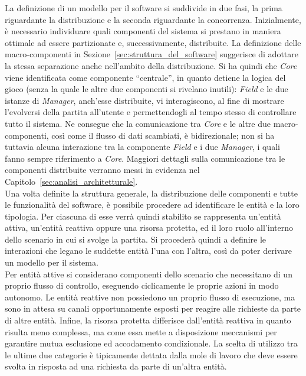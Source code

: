 La definizione di un modello per il software si suddivide in due fasi, la prima riguardante la distribuzione e la seconda riguardante la concorrenza. Inizialmente, è necessario individuare quali componenti del sistema si prestano in maniera ottimale ad essere partizionate e, successivamente, distribuite. La definizione delle macro-componenti in Sezione~\ref{sec:struttura_del_software} suggerisce di adottare la stessa separazione anche nell'ambito della distribuzione. Si ha quindi che \emph{Core} viene identificata come componente ``centrale'', in quanto detiene la logica del gioco (senza la quale le altre due componenti si rivelano inutili): \emph{Field} e le due istanze di \emph{Manager}, anch'esse distribuite, vi interagiscono, al fine di mostrare l'evolversi della partita all'utente e permettendogli al tempo stesso di controllare tutto il sistema. Ne consegue che la comunicazione tra \emph{Core} e le altre due macro-componenti, così come il flusso di dati scambiati, è bidirezionale; non si ha tuttavia alcuna interazione tra la componente \emph{Field} e i due \emph{Manager}, i quali fanno sempre riferimento a \emph{Core}. Maggiori dettagli sulla comunicazione tra le componenti distribuite verranno messi in evidenza nel Capitolo~\ref{sec:analisi_architetturale}.\\

Una volta definite la struttura generale, la distribuzione delle componenti e tutte le funzionalità del software, è possibile procedere ad identificare le entità e la loro tipologia. Per ciascuna di esse verrà quindi stabilito se rappresenta un'entità attiva, un'entità reattiva oppure una risorsa protetta, ed il loro ruolo all'interno dello scenario in cui si svolge la partita. Si procederà quindi a definire le interazioni che legano le suddette entità l'una con l'altra, così da poter derivare un modello per il sistema.\\

Per entità attive si considerano componenti dello scenario che necessitano di un proprio flusso di controllo, eseguendo ciclicamente le proprie azioni in modo autonomo. Le entità reattive non possiedono un proprio flusso di esecuzione, ma sono in attesa su canali opportunamente esposti per reagire alle richieste da parte di altre entità. Infine, la risorsa protetta differisce dall'entità reattiva in quanto risulta meno complessa, ma come essa mette a disposizione meccanismi per garantire mutua esclusione ed accodamento condizionale. La scelta di utilizzo tra le ultime due categorie è tipicamente dettata dalla mole di lavoro che deve essere svolta in risposta ad una richiesta da parte di un'altra entità.

